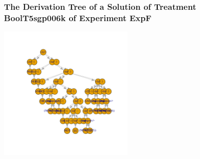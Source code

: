  \begin{frame}
 \frametitle{ The Derivation Tree of a Solution of Treatment BoolT5sgp006k of Experiment ExpF }
 \begin{center}
\includegraphics[width=0.5\textwidth, angle=0]
{ExpFDerivationTreeFigure004.pdf}
 \end{center}
 \label{templateReport/ExpFDerivationTreeFigure004.pdf}  
 \end{frame}

